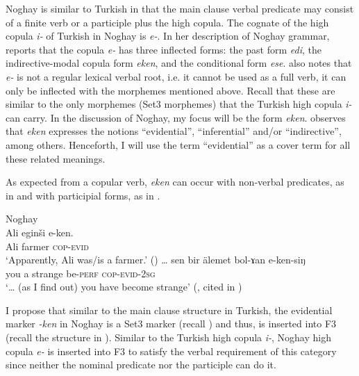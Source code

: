 \documentclass[output=paper]{langsci/langscibook}
\begin{document}
Noghay is similar to Turkish in that the main clause verbal predicate may consist of a finite verb or a participle plus the high copula. 
The cognate of the high copula \textit{i-} of Turkish in Noghay is \textit{e-}. 
In her description of Noghay grammar, \citet{Karakoc2001} reports that the copula \textit{e-} has three inflected forms: 
the past form \textit{edi}, 
the indirective-modal copula form \textit{eken}, 
and the conditional form \textit{ese}. 
\citet{Karakoc2001} also notes that \textit{e-} is not a regular lexical verbal root, i.e. it cannot be used as a full verb, 
it can only be inflected with the morphemes mentioned above. 
Recall that these are similar to the only morphemes (Set3 morphemes) that the Turkish high copula \textit{i-} can carry. 
In the discussion of Noghay, my focus will be the form \textit{eken}. 
\citet{Karakoc2001} observes that \textit{eken} expresses the notions ``evidential'', ``inferential'' and/or ``indirective'', among others. 
Henceforth, I will use the term ``evidential'' as a cover term for all these related meanings. 

As expected from a copular verb, \textit{eken} can occur with non-verbal predicates, as in  
and with participial forms, as in . 

\ea Noghay\\%
    \label{kelepirex:key:16}
    \ea 
        \label{kelepirex:key:16a}
        \gll Ali eginši e-ken. \\
        Ali farmer \textsc{cop}-\textsc{evid} \\
        \glt `Apparently, Ali was/is a farmer.' (\citealp[23]{Karakoc2001})
    \ex 
        \label{kelepirex:key:16b}
        \gll \ldots{} sen bir älemet bol-ɤan e-ken-siŋ \\
        {} you a strange be-\textsc{perf} \textsc{cop}-\textsc{evid}-\textsc{2sg}\\
        \glt `\ldots{} (as I find out) you have become strange' (\citealp[33]{Kazakov1983}, cited in \citealp[25]{Karakoc2001})
    \z
\z  

I propose that similar to the main clause structure in Turkish, the evidential marker \textit{-ken} in Noghay is a Set3 marker (recall ) and thus, is inserted into F3 (recall the structure in ). 
Similar to the Turkish high copula \textit{i-}, Noghay high copula \textit{e-} is inserted into F3 to satisfy the verbal requirement of this category since neither the nominal predicate  nor the participle  can do it.  
\end{document}
